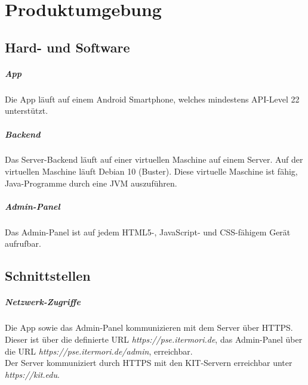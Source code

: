 \newpage
\chapter{Produktumgebung}

\section{Hard- und Software}
    \paragraph{App}
        Die App läuft auf einem Android Smartphone, welches mindestens API-Level 22 unterstützt.

    \paragraph{Backend}
        Das Server-Backend läuft auf einer virtuellen Maschine auf einem Server.
        Auf der virtuellen Maschine läuft Debian 10 (Buster).
        Diese virtuelle Maschine ist fähig, Java-Programme durch eine JVM auszuführen.

    \paragraph{Admin-Panel}
        Das Admin-Panel ist auf jedem HTML5-, JavaScript- und CSS-fähigem Gerät aufrufbar.

\section{Schnittstellen}
    \paragraph{Netzwerk-Zugriffe}
        Die App sowie das Admin-Panel kommunizieren mit dem Server über HTTPS. Dieser ist über die definierte URL \textit{https://pse.itermori.de},
        das Admin-Panel über die URL \textit{https://pse.itermori.de/admin}, erreichbar. \\
        Der Server kommuniziert durch HTTPS mit den KIT-Servern erreichbar unter \textit{https://kit.edu}.
